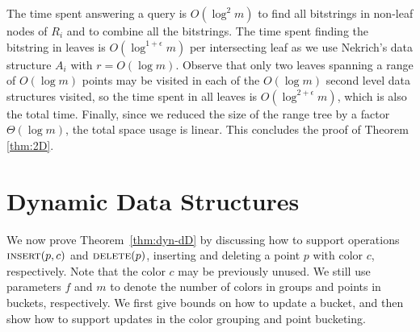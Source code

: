 The time spent answering a query is $O(\log ^2 m)$ to find all bitstrings in non-leaf nodes of $R_i$ and to combine all the bitstrings. The time spent finding the bitstring in leaves is $O(\log ^{1+\epsilon} m)$ per intersecting leaf as we use Nekrich's data structure $A_i$ with $r = O(\log m)$. Observe that only two leaves spanning a range of $O(\log m)$ points may be visited in each of the $O(\log m)$ second level data structures visited, so the time spent in all leaves is $O(\log ^{2+\epsilon} m)$, which is also the total time. Finally, since we reduced the size of the range tree by a factor $\Theta(\log m)$, the total space usage is linear. This concludes the proof of Theorem \ref{thm:2D}. 



\section{Dynamic Data Structures}
\label{sec:dynamic}
%
We now prove Theorem~\ref{thm:dyn-dD} by discussing how to support operations $\textsc{insert}(p, c)$ and $\textsc{delete}(p)$, inserting and deleting a point $p$ with color $c$, respectively. Note that the color $c$ may be previously unused. We still use parameters $f$ and $m$ to denote the number of colors in groups and points in buckets, respectively.
We first give bounds on how to update a bucket, and then show how to support updates in the color grouping and point bucketing. 


